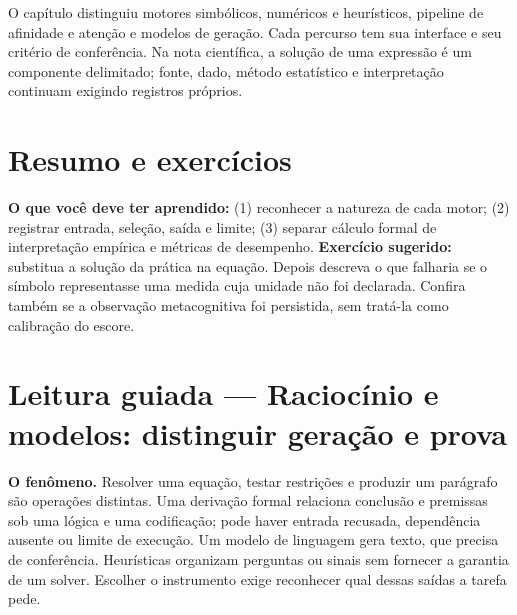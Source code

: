 \begin{resultado}
O capítulo distinguiu motores simbólicos, numéricos e heurísticos, pipeline
de afinidade e atenção e modelos de geração. Cada percurso tem sua interface
e seu critério de conferência. Na nota científica, a solução de uma expressão
é um componente delimitado; fonte, dado, método estatístico e interpretação
continuam exigindo registros próprios.
\end{resultado}


\section{Resumo e exercícios}

\begin{resultado}
\textbf{O que você deve ter aprendido:} (1) reconhecer a natureza de cada
motor; (2) registrar entrada, seleção, saída e limite; (3) separar cálculo
formal de interpretação empírica e métricas de desempenho.
\textbf{Exercício sugerido:} substitua a solução da prática na equação.
Depois descreva o que falharia se o símbolo representasse uma medida cuja
unidade não foi declarada. Confira também se a observação metacognitiva
foi persistida, sem tratá-la como calibração do escore.
\end{resultado}



\section[Leitura guiada]{Leitura guiada — Raciocínio e modelos: distinguir geração e prova}


\begin{descricao}
\textbf{O fenômeno.} Resolver uma equação, testar restrições e produzir um
parágrafo são operações distintas. Uma derivação formal relaciona conclusão
e premissas sob uma lógica e uma codificação; pode haver entrada recusada,
dependência ausente ou limite de execução. Um modelo de linguagem gera texto,
que precisa de conferência. Heurísticas organizam perguntas ou sinais sem
fornecer a garantia de um solver. Escolher o instrumento exige reconhecer
qual dessas saídas a tarefa pede.
\end{descricao}

